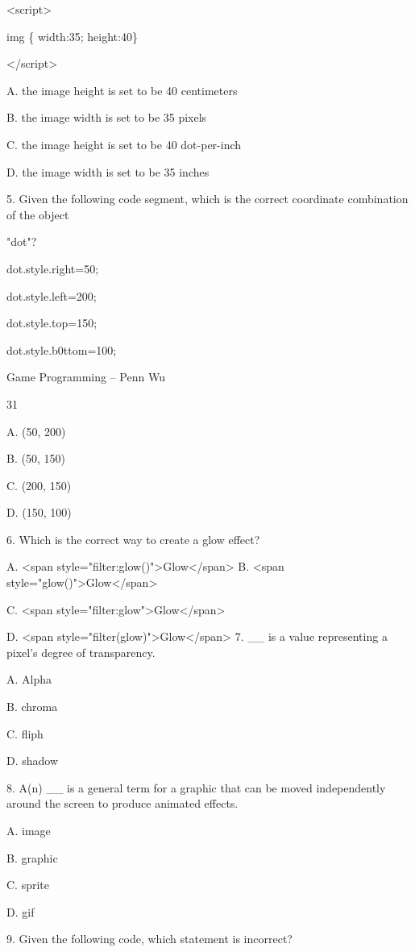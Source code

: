 \documentclass[
]{article}
\begin{document}
\textless script\textgreater{}

img \{ width:35; height:40\}

\textless/script\textgreater{}

A. the image height is set to be 40 centimeters

B. the image width is set to be 35 pixels

C. the image height is set to be 40 dot-per-inch

D. the image width is set to be 35 inches

5. Given the following code segment, which is the correct coordinate
combination of the object

"dot"?

dot.style.right=50;

dot.style.left=200;

dot.style.top=150;

dot.style.b0ttom=100;

Game Programming -- Penn Wu

31

\protect\hypertarget{index_split_003.htmlux5cux23p32}{}{}A. (50, 200)

B. (50, 150)

C. (200, 150)

D. (150, 100)

6. Which is the correct way to create a glow effect?

A. \textless span
style="filter:glow()"\textgreater Glow\textless/span\textgreater{} B.
\textless span
style="glow()"\textgreater Glow\textless/span\textgreater{}

C. \textless span
style="filter:glow"\textgreater Glow\textless/span\textgreater{}

D. \textless span
style="filter(glow)"\textgreater Glow\textless/span\textgreater{} 7.
\_\_ is a value representing a pixel's degree of transparency.

A. Alpha

B. chroma

C. fliph

D. shadow

8. A(n) \_\_ is a general term for a graphic that can be moved
independently around the screen to produce animated effects.

A. image

B. graphic

C. sprite

D. gif

9. Given the following code, which statement is incorrect?
\end{document}
